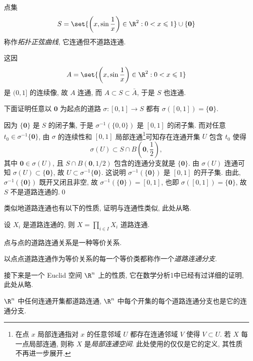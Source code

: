    \begin{Example}[拓扑正弦曲线]
        点集
        \[
            S=\set{\left(x,\sin\frac{1}{x}\right)\in\R^2 : 0<x\leqslant 1}\cup\{\mathbf{0}\}
        \]
        称作\emph{拓扑正弦曲线}, 它连通但不道路连通.
    \end{Example}
    \begin{Proof}
        这因
        \[
            A=\set{\left(x,\sin\frac{1}{x}\right)\in\R^2 : 0<x\leqslant 1}
        \]
        是 $ (0,1] $ 的连续像, 故 $ A $ 连通, 而 $ A\subset S\subset\bar{A} $, 于是 $ S $ 也连通.

        下面证明任意以 $ \mathbf{0} $ 为起点的道路 $ \sigma : [0,1]\to S $ 都有 $ \sigma([0,1])=\{\mathbf{0}\} $.

        因为 $ \{\mathbf{0}\} $ 是 $ S $ 的闭子集, 于是 $ \sigma^{-1}(\{0,0\}) $ 是 $ [0,1] $ 的闭子集. 而对任意 $ t_0\in\sigma^{-1}\{\mathbf{0}\} $, 由 $ \sigma $ 的连续性和 $ [0,1] $ 局部连通\footnote{在点 $ x $ 局部连通指对 
        $ x $ 的任意邻域 $ U $ 都存在连通邻域 $ V $ 使得 $ V\subset U $. 若 $ X $ 每一点局部连通, 则称 $ X $ 是\emph{局部连通空间}. 此处使用的仅仅是它的定义, 其性质不再进一步展开.}可知存在连通开集 $ U $ 包含 $ t_0 $ 使得
        \[
            \sigma(U)\subset S\cap B\left(\mathbf{0},\frac{1}{2}\right),
        \]
        其中 $ \mathbf{0}\in\sigma(U) $, 且 $ S\cap B(\mathbf{0},1/2) $ 包含的连通分支就是 $ \{\mathbf{0}\} $. 由 $ \sigma(U) $ 连通可知 $ \sigma(U)\subset\{\mathbf{0}\} $, 故 $ U\subset\sigma^{-1}\{\mathbf{0}\} $. 这说明 $ \sigma^{-1}(\{\mathbf{0}\}) $ 是 $ [0,1] $ 的开子集. 由此, $ \sigma^{-1}(\{\mathbf{0}\}) $ 既开又闭且非空, 故 $ \sigma^{-1}(\{\mathbf{0}\})=[0,1] $, 也即 $ \sigma([0,1])=\{\mathbf{0}\} $, 故 $ S $ 不是道路连通的.\qed
    \end{Proof}

    类似地道路连通也有以下的性质, 证明与连通性类似, 此处从略.

    \begin{Proposition}[积拓扑的道路连通性]
        设 $ X_i $ 是道路连通的, 则 $ X=\prod_{i\in I}X_i $ 道路连通.
    \end{Proposition}
    
    \begin{Proposition}[点点道路连通]
        点与点的道路连通关系是一种等价关系.
    \end{Proposition}

    \begin{Definition}[道路连通分支]
        以点点道路连通作为等价关系的每一个等价类都称作一个\emph{道路连通分支}.
    \end{Definition}

    接下来是一个 Euclid 空间 $ \R^n $ 上的性质, 它在数学分析1中已经有过详细的证明, 此处从略.

    \begin{Proposition}
        $ \R^n $ 中任何连通开集都道路连通, $ \R^n $ 中每个开集的每个道路连通分支也是它的连通分支.
    \end{Proposition}
